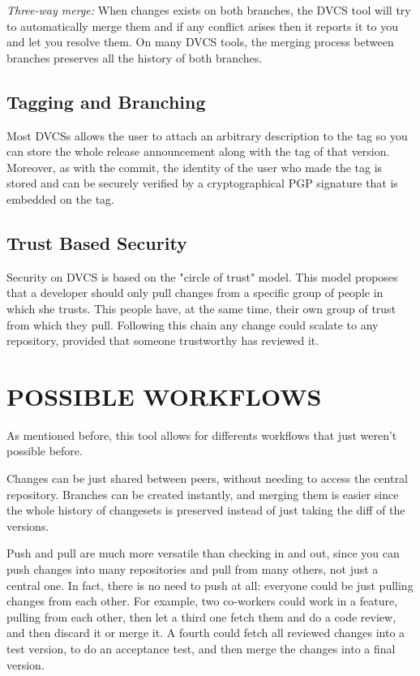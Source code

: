 \documentclass[a4paper,10pt]{article}
\begin{document}
\emph{Three-way merge:} When changes exists on both branches, the DVCS tool will try to automatically merge them and if any conflict arises then it reports it to you and let you resolve them. 
On many DVCS tools, the merging process\cite{svnmerging} between branches preserves all the history of 
both branches.

\subsection{Tagging and Branching}
Most DVCSs allows the user to attach an arbitrary description to the tag so you can store the whole release announcement along with the tag of that version. Moreover, as with the commit, the identity of the user who made the tag is stored and can be securely verified by a cryptographical PGP signature that is embedded on the tag.

\subsection{Trust Based Security}
Security on DVCS is based on the "circle of trust" model. This model proposes that a developer should only pull changes from a specific group of people
in which she trusts. This people have, at the same time, their own group of trust from which they pull. Following this chain any change could scalate
to any repository, provided that someone trustworthy has reviewed it.




\section{POSSIBLE WORKFLOWS}
\label{WORKFLOWS}

As mentioned before, this tool allows for differents workflows that just weren't 
possible before.

Changes can be just shared between peers, without needing to access the central 
repository. Branches can be created instantly, and merging them is easier since 
the whole history of changesets is preserved instead of just taking the diff of 
the versions.

Push and pull are much more versatile than checking in and out, since you can push 
changes into many repositories and pull from many others, not just a central one.
In fact, there is no need to push at all:
everyone could be just pulling changes from each other. For example, two co-workers could work 
in a feature, pulling from each other, then let a third one fetch them and do a code review, and then 
discard it or merge it. A fourth could fetch all reviewed changes into a test version, to do an 
acceptance test, and then merge the changes into a final version.
\end{document}
